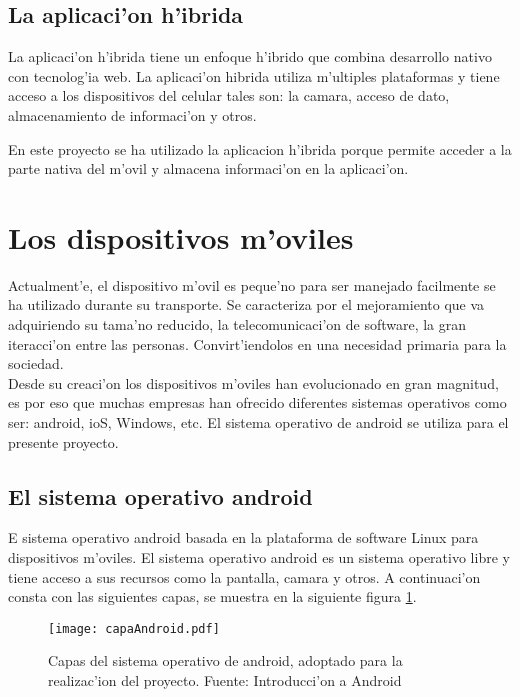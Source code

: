 \subsection{La aplicaci'on h'ibrida}
La aplicaci'on h'ibrida tiene un  enfoque h'ibrido que combina desarrollo nativo con tecnolog'ia web. La aplicaci'on hibrida utiliza  m'ultiples plataformas y tiene acceso a los dispositivos del celular tales son: la camara, acceso de dato, almacenamiento de informaci'on y otros.

En este proyecto se ha utilizado la aplicacion h'ibrida porque permite acceder a la parte nativa del m'ovil y almacena informaci'on en la aplicaci'on.

\section{Los dispositivos m'oviles}
Actualment'e, el dispositivo m'ovil es peque'no para ser manejado facilmente se ha utilizado durante su transporte. Se caracteriza por el mejoramiento que va adquiriendo su tama'no reducido, la telecomunicaci'on de software,  la gran iteracci'on entre las personas. Convirt'iendolos en una necesidad primaria para la sociedad\cite{Morillo2014}.\\
Desde su creaci'on  los dispositivos m'oviles han evolucionado en gran magnitud, es por eso que muchas empresas han ofrecido diferentes sistemas operativos como ser: android, ioS, Windows, etc. El sistema operativo de android se utiliza para el presente proyecto.

\subsection{El sistema operativo android}
E sistema operativo android basada en la  plataforma de software Linux para dispositivos m'oviles. 
El sistema operativo android es un sistema operativo libre y tiene acceso a sus recursos como la pantalla, camara y otros\cite{Android}. A continuaci'on consta con las siguientes capas, se muestra en la siguiente figura \ref{fig:Android}.

\begin{figure}[H]
\centering
\texttt{[image: capaAndroid.pdf]}
\captionsetup{justification=centering, margin=2cm}
\caption{Capas del sistema operativo de android, adoptado para la realizac'ion del proyecto. Fuente: Introducci'on a Android  \cite{Android}}
\label{fig:Android}
\end{figure}

